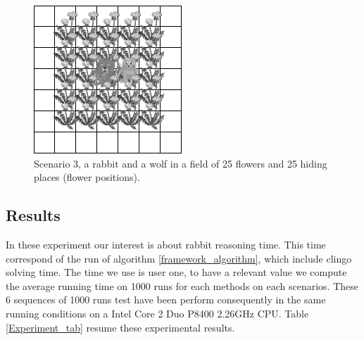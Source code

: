 \documentclass{aamas2012}
\begin{document}
	\begin{figure}
		\centering
		\includegraphics[keepaspectratio=true, scale=0.5]{scenario_3.png}
		\caption
		{
			\label{scenario_3}
			Scenario 3, a rabbit and a wolf in a field of 25 flowers and 25 hiding places (flower positions).
		}
	\end{figure}
	
\subsection{Results}

	In these experiment our interest is about rabbit reasoning time.
	This time correspond of the run of algorithm \ref{framework_algorithm}, which include clingo solving time.
	The time we use is user one, to have a relevant value we compute the average running time on 1000 runs for each methods on each scenarios.
	These 6 sequences of 1000 runs test have been perform consequently in the same running conditions on a Intel Core 2 Duo P8400 2.26GHz CPU.
	Table \ref{Experiment_tab} resume these experimental results.
	
\end{document}
